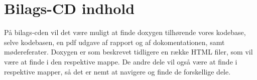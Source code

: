 \chapter{Bilags-CD indhold}\label{chap:bilagsCD}
På bilags-cden vil det være muligt at finde doxygen tilhørende vores kodebase, selve kodebasen, en pdf udgave af rapport og af dokomentationen, samt mødereferater.
Doxygen er som beskrevet tidligere en række HTML filer, som vil være at finde i den respektive mappe.
De andre dele vil også være at finde i respektive mapper, så det er nemt at navigere og finde de forskellige dele.